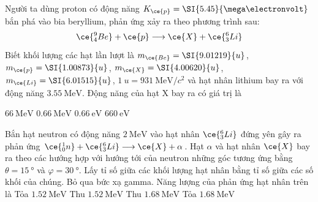 \begin{ex}
	Người ta dùng proton có động năng $K_{\ce{p}}=\SI{5.45}{\mega\electronvolt}$   bắn phá vào bia beryllium, phản ứng xảy ra theo phương trình sau:
	$$\ce{^9_4Be}+\ce{p}\longrightarrow\ce{X}+\ce{^6_3Li}$$
	Biết khối lượng các hạt lần lượt là $m_{\ce{Be}}=\SI{9.01219}{u}$, $m_{\ce{p}}=\SI{1.00873}{u}$, $m_{\ce{X}}=\SI{4.00620}{u}$, $m_{\ce{Li}}=\SI{6.01515}{u}$, $\SI{1}{u}=\SI{931}{\mega\electronvolt/c^2}$ và hạt nhân lithium bay ra với động năng $\SI{3.55}{\mega\electronvolt}$. Động năng của hạt X bay ra có giá trị là
	
	\choice
	{$\SI{66}{\mega\electronvolt}$}
	{\True $\SI{0.66}{\mega\electronvolt}$}
	{$\SI{0.66}{\electronvolt}$}
	{$\SI{660}{\electronvolt}$}
\end{ex}
\begin{ex}
	Bắn hạt neutron có động năng $\SI{2}{\mega\electronvolt}$ vào hạt nhân $\ce{^6_3Li}$   đứng yên gây ra phản ứng $\ce{^1_0n}+\ce{^6_3Li}\longrightarrow\ce{X}+\alpha$. Hạt $\alpha$ và hạt nhân $\ce{X}$ bay ra theo các hướng hợp với hướng tới của neutron những góc tương ứng bằng $\theta=\SI{15}{\degree}$ và $\varphi=\SI{30}{\degree}$. Lấy tỉ số giữa các khối lượng hạt nhân bằng tỉ số giữa các số khối của chúng. Bỏ qua bức xạ gamma. Năng lượng của phản ứng hạt nhân trên là
	\choice
	{Tỏa $\SI{1.52}{\mega\electronvolt}$}
	{Thu $\SI{1.52}{\mega\electronvolt}$}
	{\True Thu $\SI{1.68}{\mega\electronvolt}$}
	{Tỏa $\SI{1.68}{\mega\electronvolt}$}
\end{ex}
